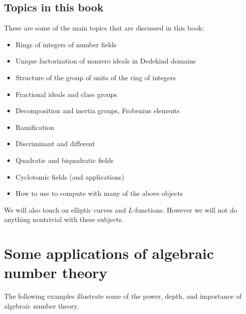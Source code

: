 \subsection{Topics in this book}
These are some of the main topics that are discussed in this book:
\begin{itemize}\setlength{\itemsep}{-.7ex}
  \item Rings of integers of number fields
  \item Unique factorization of nonzero ideals in Dedekind domains
  \item Structure of the group of units of the ring of integers
  \item Fractional ideals and class groups
  \item Decomposition and inertia groups, Frobenius elements
  \item Ramification
  \item Discriminant and different
  \item Quadratic and biquadratic fields
  \item Cyclotomic fields (and applications)
  \item How to use {\Sage} to compute with many of the above objects
\end{itemize}
We will also touch on elliptic curves and $L$-functions.
However we will not do anything nontrivial with these subjects.


\section{Some applications of algebraic number theory}
The following examples illustrate some of the power, depth, and
importance of algebraic number theory.

